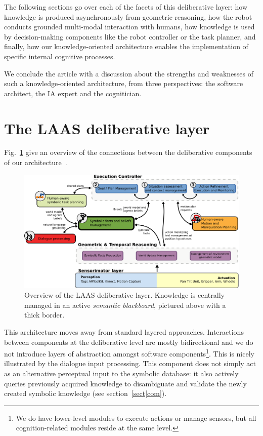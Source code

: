\documentclass[letterpaper, 10 pt, conference]{ieeeconf}  %
\begin{document}
The following sections go over each of the facets of this deliberative layer:
how knowledge is produced asynchronously from geometric reasoning, how the
robot conducts grounded multi-modal interaction with humans, how knowledge is
used by decision-making components like the robot controller or the task
planner, and finally, how our knowledge-oriented architecture enables the
implementation of specific internal cognitive processes.

We conclude the article with a discussion about the strengths and weaknesses of
such a knowledge-oriented architecture, from three perspectives: the software
architect, the IA expert and the cognitician.


\section{The LAAS deliberative layer}

Fig.~\ref{fig|archi} give an overview of the connections between the
deliberative components of our architecture~\cite{Alami2011}.

\begin{figure}
        \centering
        \includegraphics[width=1.7\columnwidth]{archi}
        \caption{Overview of the LAAS deliberative layer. Knowledge is
        centrally managed in an active \emph{semantic blackboard}, pictured
        above with a thick border.}
        \label{fig|archi}
\end{figure}


This architecture moves away from standard layered approaches. Interactions
between components at the deliberative level are mostly bidirectional and we do
not introduce layers of abstraction amongst software components\footnote{We do
have lower-level modules to execute actions or manage sensors, but all
cognition-related modules reside at the same level.}. This is nicely
illustrated by the dialogue input processing. This component does not simply
act as an alternative perceptual input to the symbolic database: it also
actively queries previously acquired knowledge to disambiguate and validate the
newly created symbolic knowledge (see section~\ref{sect|com}).
\end{document}
